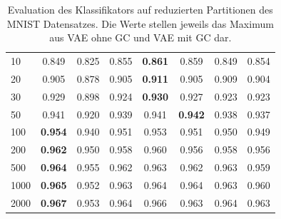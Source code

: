 \begin{table}[hbt]
{\begin{tabular}{l|c|c|c|c|c|c|c}
10                                                                & 0.849          & 0.825 & 0.855          & \textbf{0.861} & 0.859                                                           & 0.849                                                           & 0.854          \\
20                                                                & 0.905          & 0.878 & 0.905          & \textbf{0.911} & 0.905                                                           & 0.909                                                           & 0.904          \\
30                                                                & 0.929          & 0.898 & 0.924          & \textbf{0.930} & 0.927                                                           & 0.923                                                           & 0.923          \\
50                                                                & 0.941          & 0.920 & 0.939          & 0.941          & \textbf{0.942}                                                  & 0.938                                                           & 0.937          \\
100                                                               & \textbf{0.954} & 0.940 & 0.951          & 0.953          & 0.951                                                           & 0.950                                                           & 0.949          \\
200                                                               & \textbf{0.962} & 0.950 & 0.958          & 0.960          & 0.956                                                           & 0.958                                                           & 0.956          \\
500                                                               & \textbf{0.964} & 0.955 & 0.962          & 0.963          & 0.962                                                           & 0.963                                                           & 0.959          \\
1000                                                              & \textbf{0.965} & 0.952 & 0.963          & 0.964          & 0.964                                                           & 0.963                                                           & 0.960          \\
2000                                                              & \textbf{0.967} & 0.953 & 0.964          & 0.966          & 0.963                                                           & 0.964                                                           & 0.963          \\
\bottomrule
\end{tabular}}
\caption{Evaluation des Klassifikators auf reduzierten Partitionen des MNIST Datensatzes. Die Werte stellen jeweils das Maximum aus VAE ohne GC und VAE mit GC dar.}
\label{tab:mnist_few_shot}
\end{table}

